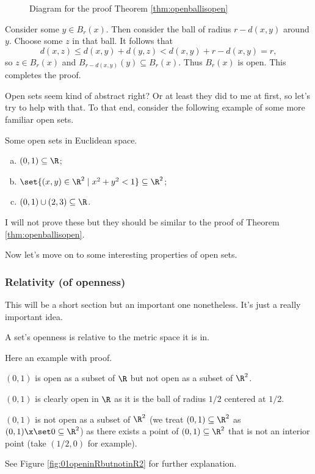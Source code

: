 \documentclass[class=article, crop=false]{standalone}
\begin{document}
\begin{figure}[ht]
    \centering
    \caption{Diagram for the proof Theorem \ref{thm:openballisopen}}
    \label{fig:openballisopen}
\end{figure}

\begin{pf}
    Consider some $y \in B_r(x)$. Then consider the ball of radius $r-d(x,y)$ around $y$. Choose some $z$ in that ball. It follows that
        \[
            d(x,z) \leq d(x,y) + d(y,z) < d(x,y) + r - d(x,y) = r,
        \]
    so $z \in B_r(x)$ and $B_{r-d(x,y)}(y) \subseteq B_r(x)$. Thus $B_r(x)$ is open. This completes the proof.
\end{pf}

Open sets seem kind of abstract right? Or at least they did to me at first, so let's try to help with that. To that end, consider the following example of some more familiar open sets.
\begin{ex}
    Some open sets in Euclidean space.
        \begin{enumerate}[(a)]
            \item $(0,1) \subseteq \R$;
            \item $\set{(x,y) \in \R^2 \mid x^2+y^2<1} \subseteq \R^2$;
            \item $(0,1) \cup (2,3) \subseteq \R$.
        \end{enumerate}
\end{ex}
\begin{rem}
    I will not prove these but they should be similar to the proof of Theorem \ref{thm:openballisopen}.
\end{rem}

Now let's move on to some interesting properties of open sets.

\subsubsection*{Relativity (of openness)}

This will be a short section but an important one nonetheless. It's just a really important idea.
\begin{fact}
    A set's openness is relative to the metric space it is in.
\end{fact}

Here an example with proof.
\begin{ex}
    $(0,1)$ is open as a subset of $\R$ but not open as a subset of $\R^2$.
\end{ex}
\begin{pf}
    $(0,1)$ is clearly open in $\R$ as it is the ball of radius $1/2$ centered at $1/2$.

    $(0,1)$ is not open as a subset of $\R^2$ (we treat $(0,1) \subseteq \R^2$ as $(0,1) \x \set 0 \subseteq \R^2$) as there exists a point of $(0,1) \subseteq \R^2$ that is not an interior point (take $(1/2,0)$ for example).

    See Figure \ref{fig:01openinRbutnotinR2} for further explanation.
\end{pf}
\end{document}
